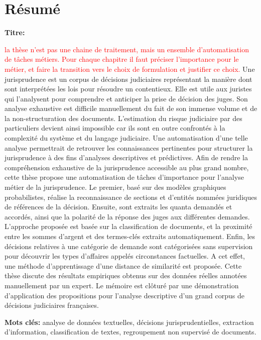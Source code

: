 \chapter*{Résumé}
\textbf{Titre:} \textsc{\titlefr}

\textcolor{red}{la thèse n'est pas une chaine de traitement, mais un ensemble d'automatisation de tâches métiers. Pour chaque chapitre il faut préciser l'importance pour le métier, et faire la transition vers le choix de formulation et justifier ce choix. }
Une jurisprudence est un corpus de décisions judiciaires représentant la manière dont sont interprétées les lois pour résoudre un contentieux. Elle est utile aux juristes qui l'analysent pour comprendre et anticiper la prise de décision des juges. Son analyse exhaustive est difficile manuellement du fait de son immense volume et de la non-structuration des documents. L'estimation du risque judiciaire par des particuliers devient ainsi impossible car ils sont en outre confrontés à la complexité du système et du langage judiciaire. Une automatisation d'une telle analyse permettrait de retrouver les connaissances pertinentes pour structurer la jurisprudence à des fins d'analyses descriptives et prédictives.  
Afin de rendre la compréhension exhaustive de la jurisprudence accessible au plus grand nombre, cette thèse propose une automatisation de tâches d'importance pour l'analyse métier de la jurisprudence. Le premier, basé sur des modèles graphiques probabilistes, réalise la reconnaissance de sections et d'entités nommées juridiques de références de la décision. Ensuite, sont extraits les quanta demandés et accordés, ainsi que la polarité de la réponse des juges aux différentes demandes. L'approche proposée est basée sur la classification de documents, et la proximité entre les sommes d'argent et des termes-clés extraits automatiquement. Enfin, les décisions relatives à une catégorie de demande sont catégorisées sans supervision pour découvrir les types d'affaires appelés circonstances factuelles. A cet effet, une méthode d'apprentissage d'une distance de similarité est proposée.
Cette thèse discute des résultats empiriques obtenus sur des données réelles annotées manuellement par un expert. Le mémoire est clôturé par une démonstration d'application des propositions pour l'analyse descriptive d'un grand corpus de décisions judiciaires françaises.


\textbf{Mots clés:} analyse de données textuelles, décisions jurisprudentielles, extraction d'information, classification de textes, regroupement non supervisé de documents.

